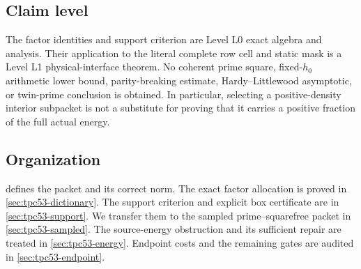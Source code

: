 \subsection{Claim level}

The factor identities and support criterion are Level L0 exact algebra
and analysis.  Their application to the literal complete row cell and
static mask is a Level L1 physical-interface theorem.  No coherent prime
square, fixed-\(h_0\) arithmetic lower bound, parity-breaking estimate,
Hardy--Littlewood asymptotic, or twin-prime conclusion is obtained.  In
particular, selecting a positive-density interior subpacket is not a
substitute for proving that it carries a positive fraction of the full
actual energy.

\subsection{Organization}

 defines the packet and its correct norm.
The exact factor allocation is proved in
\cref{sec:tpc53-dictionary}.  The support criterion and explicit box
certificate are in \cref{sec:tpc53-support}.  We transfer them to the
sampled prime--squarefree packet in \cref{sec:tpc53-sampled}.  The
source-energy obstruction and its sufficient repair are treated in
\cref{sec:tpc53-energy}.  Endpoint costs and the remaining gates are
audited in \cref{sec:tpc53-endpoint}.
